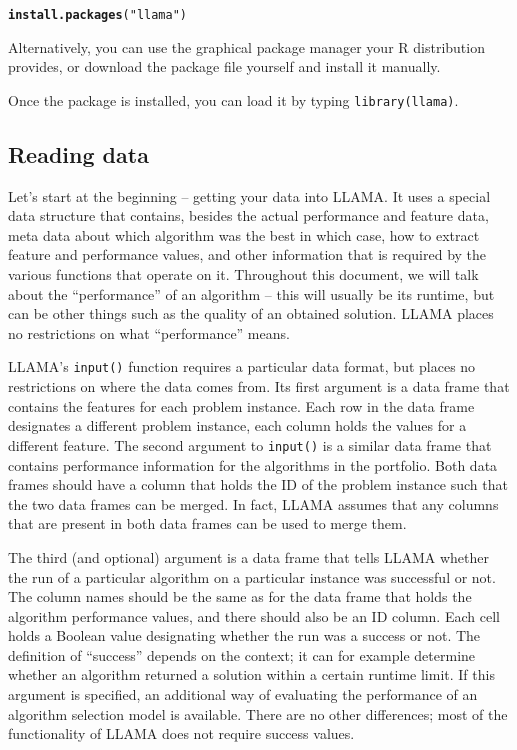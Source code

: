\documentclass{article}\usepackage[]{graphicx}\usepackage[]{color}
\makeatletter
\newcommand{\hlstr}[1]{\textcolor[rgb]{0.192,0.494,0.8}{#1}}%
\newcommand{\hlstd}[1]{\textcolor[rgb]{0.345,0.345,0.345}{#1}}%
\newcommand{\hlkwd}[1]{\textcolor[rgb]{0.737,0.353,0.396}{\textbf{#1}}}%
\newenvironment{kframe}{%
 \def\at@end@of@kframe{}%
 \ifinner\ifhmode%
  \def\at@end@of@kframe{\end{minipage}}%
  \begin{minipage}{\columnwidth}%
 \fi\fi%
 \def\FrameCommand##1{\hskip\@totalleftmargin \hskip-\fboxsep
 \colorbox{shadecolor}{##1}\hskip-\fboxsep
     \hskip-\linewidth \hskip-\@totalleftmargin \hskip\columnwidth}%
 \MakeFramed {\advance\hsize-\width
   \@totalleftmargin\z@ \linewidth\hsize
   \@setminipage}}%
 {\par\unskip\endMakeFramed%
 \at@end@of@kframe}
\newenvironment{knitrout}{}{} %
\makeatother
\begin{document}
\begin{knitrout}
\color{fgcolor}\begin{kframe}
\begin{alltt}
\hlkwd{install.packages}\hlstd{(}\hlstr{"llama"}\hlstd{)}
\end{alltt}
\end{kframe}
\end{knitrout}

Alternatively, you can use the graphical package manager your R distribution
provides, or download the package file yourself and install it manually.

Once the package is installed, you can load it by typing
\lstinline{library(llama)}.

\subsection{Reading data}

Let's start at the beginning -- getting your data into LLAMA. It uses a special
data structure that contains, besides the actual performance and feature data,
meta data about which algorithm was the best in which case, how to extract
feature and performance values, and other information that is required by the
various functions that operate on it. Throughout this document, we will talk
about the ``performance'' of an algorithm -- this will usually be its runtime,
but can be other things such as the quality of an obtained solution. LLAMA
places no restrictions on what ``performance'' means.

LLAMA's \lstinline{input()} function requires a particular data format, but
places no restrictions on where the data comes from. Its first argument is a
data frame that contains the features for each problem instance. Each row in the
data frame designates a different problem instance, each column holds the values
for a different feature. The second argument to \lstinline{input()} is a similar
data frame that contains performance information for the algorithms in the
portfolio. Both data frames should have a column that holds the ID of the
problem instance such that the two data frames can be merged. In fact, LLAMA
assumes that any columns that are present in both data frames can be used to
merge them.

The third (and optional) argument is a data frame that tells LLAMA whether the
run of a particular algorithm on a particular instance was successful or not.
The column names should be the same as for the data frame that holds the
algorithm performance values, and there should also be an ID column. Each cell
holds a Boolean value designating whether the run was a success or not. The
definition of ``success'' depends on the context; it can for example determine
whether an algorithm returned a solution within a certain runtime limit. If this
argument is specified, an additional way of evaluating the performance of an
algorithm selection model is available. There are no other differences; most of
the functionality of LLAMA does not require success values.
\end{document}
